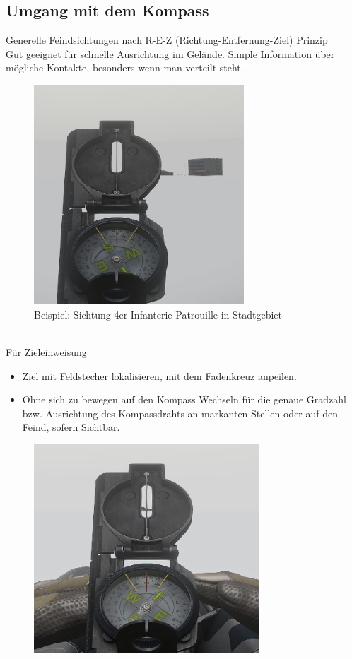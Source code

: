 \subsection{Umgang mit dem Kompass}
Generelle Feindsichtungen nach R-E-Z (Richtung-Entfernung-Ziel) Prinzip \\

Gut geeignet für schnelle Ausrichtung im Gelände. Simple Information über mögliche Kontakte, besonders wenn man verteilt steht.
\begin{figure}[!h]
	\centering
	\includegraphics[width=0.7\textwidth]{../img/advanced/kartenarbeit/Kompass1}
	\caption{Beispiel: Sichtung 4er Infanterie Patrouille in Stadtgebiet}
\end{figure}\\
	
Für Zieleinweisung
\begin{itemize}
	\item Ziel mit Feldstecher lokalisieren, mit dem Fadenkreuz anpeilen.
	\item Ohne sich zu bewegen auf den Kompass Wechseln für die genaue Gradzahl bzw. Ausrichtung des Kompassdrahts an markanten Stellen oder auf den Feind, sofern Sichtbar.
\end{itemize}

\begin{figure}[!h]
	\centering
	\includegraphics[width=0.75\textwidth]{../img/advanced/kartenarbeit/kompass2}
\end{figure}

